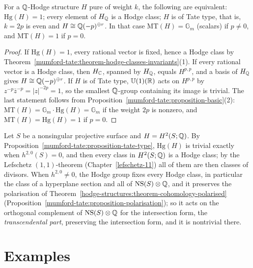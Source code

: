 \begin{proposition}\label{mumford-tate:proposition-tate-type}
For a $\mathbb{Q}$-Hodge structure $H$ pure of weight $k$, the following are equivalent: $\mathrm{Hg}(H) = 1$; every element of $H_{\mathbb{Q}}$ is a Hodge class; $H$ is of Tate type, that is, $k = 2p$ is even and
$H \cong \mathbb{Q}(-p)^{\oplus r}$. In that case $\mathrm{MT}(H) = \mathbb{G}_m$ (scalars) if $p \neq 0$, and $\mathrm{MT}(H) = 1$ if $p = 0$.
\end{proposition}

\begin{proof}
If $\mathrm{Hg}(H) = 1$, every rational vector is fixed, hence a Hodge class by Theorem~\ref{mumford-tate:theorem-hodge-classes-invariants}(1). If every rational vector is a Hodge class, then $H_{\mathbb{C}}$,
spanned by $H_{\mathbb{Q}}$, equals $H^{p,p}$, and a basis of $H_{\mathbb{Q}}$ gives $H \cong \mathbb{Q}(-p)^{\oplus r}$. If $H$ is of Tate type, $\mathbb{U}(1)(\mathbb{R})$ acts on $H^{p,p}$ by $z^{-p}\bar z^{-p} = |z|^{-2p} = 1$, so the smallest
$\mathbb{Q}$-group containing its image is trivial. The last statement follows from Proposition~\ref{mumford-tate:proposition-basic}(2): $\mathrm{MT}(H) = \mathbb{G}_m \cdot \mathrm{Hg}(H) = \mathbb{G}_m$ if the weight
$2p$ is nonzero, and $\mathrm{MT}(H) = \mathrm{Hg}(H) = 1$ if $p = 0$.
\end{proof}

\begin{example}\label{mumford-tate:example-weight-two}
Let $S$ be a nonsingular projective surface and $H = H^2(S; \mathbb{Q})$. By Proposition~\ref{mumford-tate:proposition-tate-type}, $\mathrm{Hg}(H)$ is trivial exactly when $h^{2,0}(S) = 0$, and then every class in
$H^2(S; \mathbb{Q})$ is a Hodge class; by the Lefschetz $(1,1)$-theorem (Chapter~\ref{lefschetz-11}) all of them are then classes of divisors. When $h^{2,0} \neq 0$, the Hodge group fixes every Hodge class, in particular the class of a hyperplane section and all of
$\mathrm{NS}(S) \otimes \mathbb{Q}$, and it preserves the polarisation of Theorem~\ref{hodge-structures:theorem-cohomology-polarised} (Proposition~\ref{mumford-tate:proposition-polarisation}); so it acts on the orthogonal
complement of $\mathrm{NS}(S) \otimes \mathbb{Q}$ for the intersection form, the \emph{transcendental part}, preserving the intersection form, and it is nontrivial there.
\end{example}

\section{Examples}\label{mumford-tate:section-examples}

